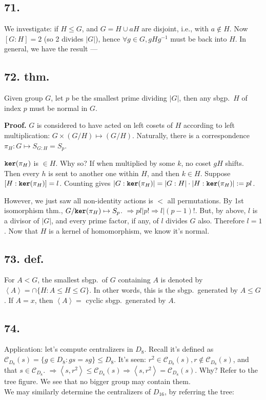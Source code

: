 \documentclass[12pt]{article}
\newcommand\M\cdot%
\newcommand\X\times%
\newcommand\Ev\forall%
\newcommand\Mp\mapsto%
\newcommand{\Ip}{\Rightarrow} %
\newcommand{\Ab}[1]{ \left\langle #1 \right\rangle } %
\newcommand{\CF}[1]{ \mathcal{#1} }%
\newcommand{\Ss}[1]{\textsf{\textbf{#1}}}%
\newcommand{\Tw}[1]{\texttt{\textbf{#1}}}%
\begin{document}
\subsection*{71.} We investigate: if \(H \leq G\), and \(G = H \cup aH\) are disjoint, i.e., with \(a \notin H\). 
Now \([G:H] =2\) (so 2 divides \(|G|\)), 
hence \(\Ev g \in G, gHg^{-1}\) must be back into \(H\). In general, we have the result ---

\subsection*{72. thm.} Given group \(G\), let \(p\) be the smallest prime dividing \(|G|\), then any sbgp.\ \(H\) of index \(p\) must be normal in \(G\). \par
\Ss{Proof.} \(G\) is considered to have acted on left cosets of \(H\) according to left multiplication: \(G \X (G/H) \Mp (G/H)\). 
Naturally, there is a correspondence \(\pi_H: G \Mp S_{G:H} = S_p\). \par
\(\Tw{ker}(\pi_H)\) is \(\in H\). Why so? If when multiplied by some \(k\), no coset \(gH\) shifts. 
Then every \(h\) is sent to another one within \(H\), 
and then \(k \in H\). 
Suppose \([H: \Tw{ker}(\pi_H)] =l\). 
Counting gives \(|G: \Tw{ker}(\pi_H)| = |G:H| \M |H: \Tw{ker}(\pi_H)| := pl\). \par
However, we just saw all non-identity actions is \(<\) all permutations. 
By 1st isomorphism thm., \(G / \Tw{ker}(\pi_H) \Mp S_p\). 
\(\Ip pl | p! \Ip l | (p-1)!\). But, by above, \(l\) is a divisor of \(|G|\), and every prime factor, if any, of \(l\) divides \(G\) also. Therefore \(l=1\). 
Now that \(H\) is a kernel of homomorphism, we know it's normal. 

\subsection*{73. def.} For \(A < G\), the smallest sbgp.\ of \(G\) containing \(A\) is denoted by \(\Ab{A} = \cap \{H: A \leq H \leq G \}\). 
In other words, this is the sbgp.\ generated by \(A \leq G\). 
If \(A={x}\), then \(\Ab{A} =\) cyclic sbgp.\ generated by \(A\). 

\subsection*{74.} Application: let's compute centralizers in \(D_8\). 
Recall it's defined as \(\CF C_{D_8}(s) = \{g \in D_8: gs = sg\} \leq D_8\). 
It's seen: \(r^2 \in \CF C_{D_8}(s), r \notin \CF C_{D_8}(s)\), and that \(s \in \CF C_{D_8}\). \(\Ip \Ab{s,r^2} \leq \CF C_{D_8}(s) \Ip \Ab{s,r^2} = \CF C_{D_8}(s)\). 
Why? Refer to the tree figure. We see that no bigger group may contain them. \\
\indent We may similarly determine the centralizers of \(D_{16}\), by referring the tree: \\
\end{document}

